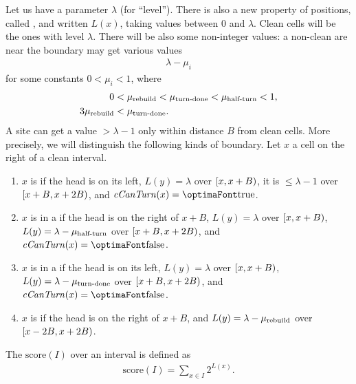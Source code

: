\documentclass[12pt]{memoir}
\renewcommand{\le}{\leq}
\newcommand{\fld}[1]{\ensuremath{\textit{#1\/}}}
\def\B{B}
\newcommand{\score}{\mathrm{score}}
\newcommand{\cCanTurn}{\fld{cCanTurn}}
\newcommand{\Cns}[2]{#1_{\textrm{\upshape #2}}}
\newcommand{\mHalfTurn}{\Cns{\mu}{half-turn}}
\newcommand{\mTurnDone}{\Cns{\mu}{turn-done}}
\newcommand{\mRebuild}{\Cns{\mu}{rebuild}}
\begin{document}
Let us have a parameter \( \lambda \) (for ``level'').
There is also a new property of positions, called , and written \( L(x) \),
taking values between 0 and \( \lambda \).
Clean cells will be the ones with level \( \lambda \).
There will be also some non-integer values: a non-clean are near the boundary may get
various values
\begin{align*}
 \lambda-\mu_{i}
 \end{align*}
for some constants \( 0<\mu_{i}<1 \), where
\begin{align*}
     0 &<\mRebuild<\mTurnDone<\mHalfTurn<1,
\\
   3\mRebuild &<\mTurnDone.
 \end{align*}
A site can get a value \( >\lambda-1 \) only within distance \( \B \) from 
clean cells.
More precisely, we will distinguish the following kinds of boundary.
Let \( x \) a cell on the right of a clean interval.
\begin{sloppypar}
\begin{enumerate}[label=\upshape{(B\arabic*)}, ref=B\arabic*]

\item \( x \) is  if the head is on its left,
\( L(y)=\lambda \) over \( \lint{x}{x+\B} \), 
it is \( \le\lambda-1 \) over \( \lint{x+\B}{x+2\B} \), %
and \( \cCanTurn(x)=\true \).

\item \( x \) is in a  if the head is on the right of \( x+\B \),
 \( L(y)=\lambda \) over \( \lint{x}{x+\B} \),
\( L(y)=\lambda-\mHalfTurn \) over \( \lint{x+\B}{x+2\B} \),
and \( \cCanTurn(x)=\false \).

\item \( x \) is in a  if the head is on its left,
\( L(y)=\lambda \) over \( \lint{x}{x+\B} \),
\( L(y)=\lambda-\mTurnDone \) over \( \lint{x+\B}{x+2\B} \),
and \( \cCanTurn(x)=\false \).

\item \( x \) is  if the head is on the right of \( x+\B \),
 and \( L(y)=\lambda-\mRebuild \) over \( \lint{x-2\B}{x+2\B} \). %

\end{enumerate}
  
\end{sloppypar}

The  \( \score(I) \) over an interval is defined as
 \begin{align}\label{eq:score}
  \score(I)=\sum_{x\in I}2^{L(x)}.
 \end{align}
\end{document}
